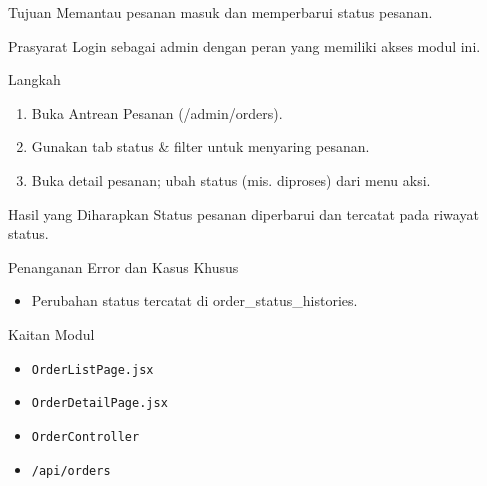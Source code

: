 
\begin{flowsection}{Tujuan}
Memantau pesanan masuk dan memperbarui status pesanan.
\end{flowsection}

\begin{flowsection}{Prasyarat}
Login sebagai admin dengan peran yang memiliki akses modul ini.
\end{flowsection}

\begin{flowsection}{Langkah}
\begin{enumerate}
  \item Buka Antrean Pesanan (/admin/orders).
  \item Gunakan tab status \&  filter untuk menyaring pesanan.
  \item Buka detail pesanan; ubah status (mis. diproses) dari menu aksi.
\end{enumerate}
\end{flowsection}


\begin{flowsection}{Hasil yang Diharapkan}
Status pesanan diperbarui dan tercatat pada riwayat status.
\end{flowsection}

\begin{flowsection}{Penanganan Error dan Kasus Khusus}
\begin{itemize}
  \item Perubahan status tercatat di order\_status\_histories.
\end{itemize}
\end{flowsection}

\begin{flowsection}{Kaitan Modul}
\begin{itemize}
  \item \texttt{OrderListPage.jsx}
  \item \texttt{OrderDetailPage.jsx}
  \item \texttt{OrderController}
  \item \texttt{/api/orders}
\end{itemize}
\end{flowsection}

